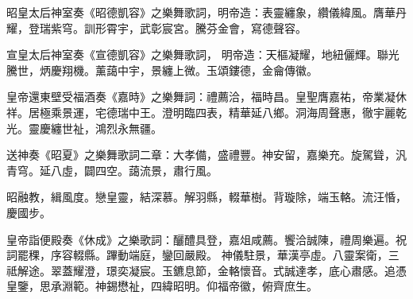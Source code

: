 \begin{pinyinscope}
 昭皇太后神室奏《昭德凱容》之樂舞歌詞，明帝造：表靈纏象，纘儀緯風。膺華丹耀，登瑞紫穹。訓形霄宇，武彰宸宮。騰芬金會，寫德聲容。



 宣皇太后神室奏《宣德凱容》之樂舞歌詞，
 明帝造：天樞凝耀，地紐儷輝。聯光騰世，炳慶翔機。薰藹中宇，景纏上微。玉頌鏤德，金龠傳徽。



 皇帝還東壁受福酒奏《嘉時》之樂舞詞：禮薦洽，福時昌。皇聖膺嘉祐，帝業凝休祥。居極乘景運，宅德瑞中王。澄明臨四表，精華延八鄉。洞海周聲惠，徹宇麗乾光。靈慶纏世祉，鴻烈永無疆。



 送神奏《昭夏》之樂舞歌詞二章：大孝備，盛禮豐。神安留，嘉樂充。旋駕聳，汎青穹。延八虛，闢四空。藹流景，肅行風。



 昭融教，緝風度。戀皇靈，結深慕。解羽縣，輟華樹。背璇除，端玉輅。流汪惛，慶國步。



 皇帝詣便殿奏《休成》之樂歌詞：釃醴具登，嘉俎咸薦。饗洽誠陳，禮周樂遍。祝詞罷稞，序容輟縣。蹕動端庭，鑾回嚴殿。
 神儀駐景，華漢亭虛。八靈案衛，三祗解途。翠蓋耀澄，璟奕凝宸。玉鑣息節，金輅懷音。式誠達孝，底心肅感。追憑皇鑒，思承淵範。神錫懋祉，四緯昭明。仰福帝徽，俯齊庶生。



\end{pinyinscope}